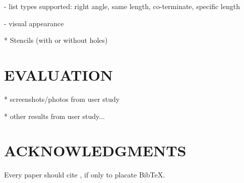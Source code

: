 \documentclass{article}
\begin{document}
  - list types supported: right angle, same length, co-terminate, specific length

  - visual appearance

* Stencils (with or without holes)

\section{EVALUATION}

* screenshots/photos from user study

* other results from user study...

\section{ACKNOWLEDGMENTS}

Every paper should cite \cite{sutherland-sketchpad}, if only to placate BibTeX.



\end{document}
